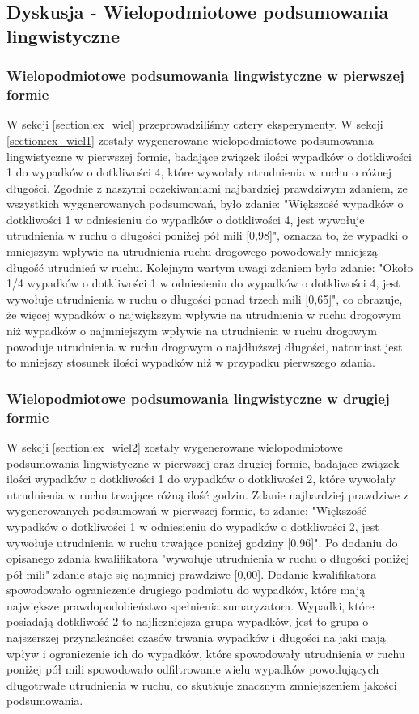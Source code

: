 \documentclass{classrep}
\begin{document}
\subsection{ Dyskusja - Wielopodmiotowe podsumowania lingwistyczne}

\subsubsection{Wielopodmiotowe podsumowania lingwistyczne w pierwszej formie}

W sekcji \ref{section:ex_wiel} przeprowadziliśmy cztery eksperymenty. W sekcji \ref{section:ex_wiel1} zostały wygenerowane wielopodmiotowe podsumowania lingwistyczne w pierwszej formie, badające związek ilości wypadków o dotkliwości 1 do wypadków o dotkliwości 4, które wywołały utrudnienia w ruchu o różnej długości. Zgodnie z naszymi oczekiwaniami najbardziej prawdziwym zdaniem, ze wszystkich wygenerowanych podsumowań, było zdanie: "Większość wypadków o dotkliwości 1 w odniesieniu do wypadków o dotkliwości 4, jest wywołuje utrudnienia w ruchu o długości poniżej pół mili [0,98]", oznacza to, że wypadki o mniejszym wpływie na utrudnienia ruchu drogowego powodowały mniejszą długość utrudnień w ruchu. Kolejnym wartym uwagi zdaniem było zdanie: "Około 1/4 wypadków o dotkliwości 1 w odniesieniu do wypadków o dotkliwości 4, jest wywołuje utrudnienia w ruchu o długości ponad trzech mili [0,65]", co obrazuje, że więcej wypadków o największym wpływie na utrudnienia w ruchu drogowym niż wypadków o najmniejszym wpływie na utrudnienia w ruchu drogowym powoduje utrudnienia w ruchu drogowym o najdłuższej długości, natomiast jest to mniejszy stosunek ilości wypadków niż w przypadku pierwszego zdania.\\

\subsubsection{Wielopodmiotowe podsumowania lingwistyczne w drugiej formie}

W sekcji \ref{section:ex_wiel2} zostały wygenerowane wielopodmiotowe podsumowania lingwistyczne w pierwszej oraz drugiej formie, badające związek ilości wypadków o dotkliwości 1 do wypadków o dotkliwości 2, które wywołały utrudnienia w ruchu trwające różną ilość godzin. Zdanie najbardziej prawdziwe z wygenerowanych podsumowań w pierwszej formie, to zdanie: "Większość wypadków o dotkliwości 1 w odniesieniu do wypadków o dotkliwości 2, jest wywołuje utrudnienia w ruchu trwające poniżej godziny [0,96]". Po dodaniu do opisanego zdania kwalifikatora "wywołuje utrudnienia w ruchu o długości poniżej pół mili" zdanie staje się najmniej prawdziwe [0,00]. Dodanie kwalifikatora spowodowało ograniczenie drugiego podmiotu do wypadków, które mają największe prawdopodobieństwo spełnienia sumaryzatora. Wypadki, które posiadają dotkliwość 2 to najliczniejsza grupa wypadków, jest to grupa o najszerszej przynależności czasów trwania wypadków i długości na jaki mają wpływ i ograniczenie ich do wypadków, które spowodowały utrudnienia w ruchu poniżej pół mili spowodowało odfiltrowanie wielu wypadków powodujących długotrwałe utrudnienia w ruchu, co skutkuje znacznym zmniejszeniem jakości podsumowania. \\
\end{document}
